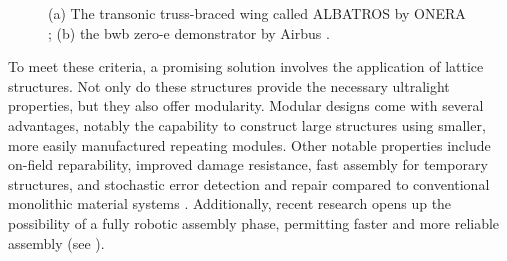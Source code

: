 \begin{figure}
    \hspace*{\fill}
    \hfill
    \hspace*{\fill}
    \caption{(a) The transonic truss-braced wing called ALBATROS by ONERA \cite{carrier_investigation_2012,carrier_multidisciplinary_2021}; (b) the \acrfull{bwb} zero-e demonstrator by Airbus \cite{noauthor_airbus_2021}.}
    \label{fig:01_concepts}
\end{figure}

To meet these criteria, a promising solution involves the application of lattice structures. Not only do these structures provide the necessary ultralight properties, but they also offer modularity. Modular designs come with several advantages, notably the capability to construct large structures using smaller, more easily manufactured repeating modules. Other notable properties include on-field reparability, improved damage resistance, fast assembly for temporary structures, and stochastic error detection and repair compared to conventional monolithic material systems . Additionally, recent research opens up the possibility of a fully robotic assembly phase, permitting faster and more reliable assembly (see ).

